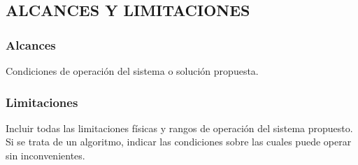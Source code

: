 \subsection*{\hspace{5mm}ALCANCES Y LIMITACIONES}
\subsubsection*{\hspace{5mm}Alcances}
Condiciones de operación del sistema o solución propuesta.
\subsubsection*{\hspace{5mm}Limitaciones}
Incluir todas las limitaciones físicas y rangos de operación del sistema propuesto. Si se trata de un algoritmo, indicar las condiciones sobre las cuales puede operar sin inconvenientes.
\newpage
